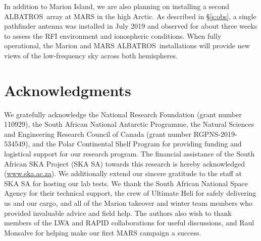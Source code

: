 \documentclass{ws-jai}
\def\albatros{ALBATROS}
\begin{document}
In addition to Marion Island, we are also planning on installing a
second \albatros\ array at MARS in the high Arctic.  As described in
\S\ref{s:obs}, a single pathfinder antenna was installed in July 2019
and observed for about three weeks to assess the RFI environment and
ionospheric conditions.  When fully operational, the Marion and MARS
\albatros\ installations will provide new views of the low-frequency
sky across both hemispheres.

\section*{Acknowledgments}

We gratefully acknowledge the National Research Foundation (grant
number 110929), the South African National Antarctic Programme, the
Natural Sciences and Engineering Research Council of Canada (grant
number RGPNS-2019-534549), and the Polar Continental Shelf Program for
providing funding and logistical support for our research program.
The financial assistance of the South African SKA Project (SKA SA)
towards this research is hereby acknowledged (\url{www.ska.ac.za}).
We additionally extend our sincere gratitude to the staff at SKA SA
for hosting our lab tests.  We thank the South African National Space
Agency for their technical support, the crew of Ultimate Heli for
safely delivering us and our cargo, and all of the Marion takeover and
winter team members who provided invaluable advice and field help.
The authors also wish to thank members of the LWA and RAPID
collaborations for useful discussions, and Raul Monsalve for helping
make our first MARS campaign a success.


{}
\end{document}
